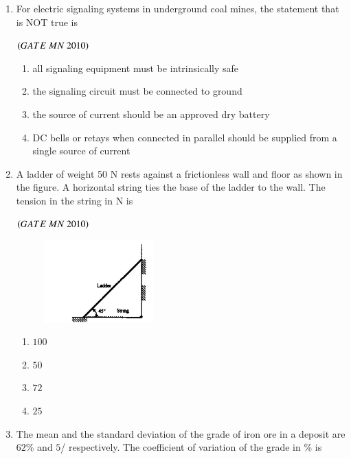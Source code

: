 \documentclass{article}
\begin{document}
\begin{enumerate}[label=Q.\arabic*., itemsep=1em, leftmargin=0pt, itemindent=*, labelsep=0.5em]
\begin{enumerate}[label=Q.\arabic*., start=17, leftmargin=2em]
\item For electric signaling systems in underground coal mines, the statement that is NOT true is
\\
\begin{flushright}
\hfill$\left(GATE\ MN\ 2010\right)$
\end{flushright}
\begin{enumerate}[label=(\Alph*),leftmargin=4em]
\item all signaling equipment must be intrinsically safe
\item the signaling circuit must be connected to ground
\item the source of current should be an approved dry battery
\item DC bells or retays when connected in parallel should be supplied from a single source of current
\end{enumerate}
\bigskip
\item  A ladder of weight 50 N rests against a frictionless wall and floor as shown in the figure. A horizontal
string ties the base of the ladder to the wall. The tension in the string in N is
\\
\begin{flushright}
\hfill$\left(GATE\ MN\ 2010\right)$
\end{flushright}
\begin{figure}[h!]
\centering
\includegraphics[width=0.4\textwidth]{figs/ladder.png} 
\end{figure}
\begin{multicols}{4}
\begin{enumerate}[label=(\Alph*),leftmargin=4em]
\item $100$
\item $50$
\item $72$
\item $25$
\end{enumerate}
\end{multicols}
\bigskip
\item The mean and the standard deviation of the grade of iron ore in a deposit are $62$\% and $5$/%
respectively. The coefficient of variation of the grade in \% is

\end{enumerate}
\end{enumerate}
\end{document}
